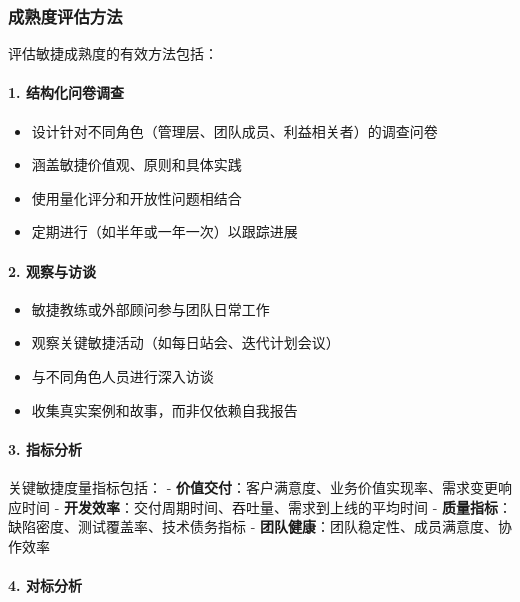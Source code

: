 \subsubsection{成熟度评估方法}\label{ux6210ux719fux5ea6ux8bc4ux4f30ux65b9ux6cd5}

评估敏捷成熟度的有效方法包括：

\paragraph{1.
结构化问卷调查}\label{ux7ed3ux6784ux5316ux95eeux5377ux8c03ux67e5}

\begin{itemize}
\tightlist
\item
  设计针对不同角色（管理层、团队成员、利益相关者）的调查问卷
\item
  涵盖敏捷价值观、原则和具体实践
\item
  使用量化评分和开放性问题相结合
\item
  定期进行（如半年或一年一次）以跟踪进展
\end{itemize}

\paragraph{2. 观察与访谈}\label{ux89c2ux5bdfux4e0eux8bbfux8c08}

\begin{itemize}
\tightlist
\item
  敏捷教练或外部顾问参与团队日常工作
\item
  观察关键敏捷活动（如每日站会、迭代计划会议）
\item
  与不同角色人员进行深入访谈
\item
  收集真实案例和故事，而非仅依赖自我报告
\end{itemize}

\paragraph{3. 指标分析}\label{ux6307ux6807ux5206ux6790}

关键敏捷度量指标包括： -
\textbf{价值交付}：客户满意度、业务价值实现率、需求变更响应时间 -
\textbf{开发效率}：交付周期时间、吞吐量、需求到上线的平均时间 -
\textbf{质量指标}：缺陷密度、测试覆盖率、技术债务指标 -
\textbf{团队健康}：团队稳定性、成员满意度、协作效率

\paragraph{4. 对标分析}\label{ux5bf9ux6807ux5206ux6790}

